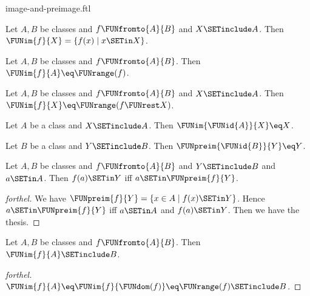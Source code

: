 \documentclass{stex}
\begin{document}
\begin{smodule}{image-and-preimage.ftl}

\begin{proposition}[forthel,id=FOUNDATIONS_07_5919649206108160]
  Let $A, B$ be classes and $f \FUNfromto{A}{B}$ and $X \SETinclude A$.
  Then $\FUNim{f}{X} = \{ f(x) \mid x \SETin X \}$.
\end{proposition}

\begin{corollary}[forthel,id=FOUNDATIONS_07_5543924730953728]
  Let $A, B$ be classes and $f \FUNfromto{A}{B}$.
  Then $\FUNim{f}{A} \eq \FUNrange(f)$.
\end{corollary}

\begin{corollary}[forthel,id=FOUNDATIONS_07_1818812171157504]
  Let $A, B$ be classes and $f \FUNfromto{A}{B}$ and $X \SETinclude A$.
  Then $\FUNim{f}{X} \eq \FUNrange(f \FUNrest X)$.
\end{corollary}

\begin{proposition}[forthel,id=FOUNDATIONS_07_911395830890496]
  Let $A$ be a class and $X \SETinclude A$.
  Then $\FUNim{\FUNid{A}}{X} \eq X$.
\end{proposition}

\begin{proposition}[forthel,id=FOUNDATIONS_07_3349817830932480]
  Let $B$ be a class and $Y \SETinclude B$.
  Then $\FUNpreim{\FUNid{B}}{Y} \eq Y$.
\end{proposition}

\begin{proposition}[forthel,id=FOUNDATIONS_07_6362984433582080]
  Let $A, B$ be classes and $f \FUNfromto{A}{B}$ and $Y \SETinclude B$ and $a \SETin A$.
  Then $f(a) \SETin Y$ iff $a \SETin \FUNpreim{f}{Y}$.
\end{proposition}
\begin{proof}[forthel]
  We have $\FUNpreim{f}{Y} = \{ x \in A \mid f(x) \SETin Y \}$.
  Hence $a \SETin \FUNpreim{f}{Y}$ iff $a \SETin A$ and $f(a) \SETin Y$.
  Then we have the thesis.
\end{proof}

\begin{proposition}[forthel,id=FOUNDATIONS_07_6730546254184448]
  Let $A, B$ be classes and $f \FUNfromto{A}{B}$.
  Then $\FUNim{f}{A} \SETinclude B$.
\end{proposition}
\begin{proof}[forthel]
  $\FUNim{f}{A}
    \eq \FUNim{f}{\FUNdom(f)}
    \eq \FUNrange(f)
    \SETinclude B$.
\end{proof}


\end{smodule}
\end{document}
